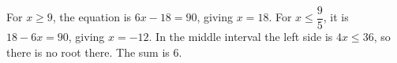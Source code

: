 For $x\ge9$, the equation is $6x-18=90$, giving $x=18$. For $x\le\dfrac{9}{5}$, it is $18-6x=90$, giving $x=-12$. In the middle interval the left side is $4x\le36$, so there is no root there. The sum is $\boxed6$.
